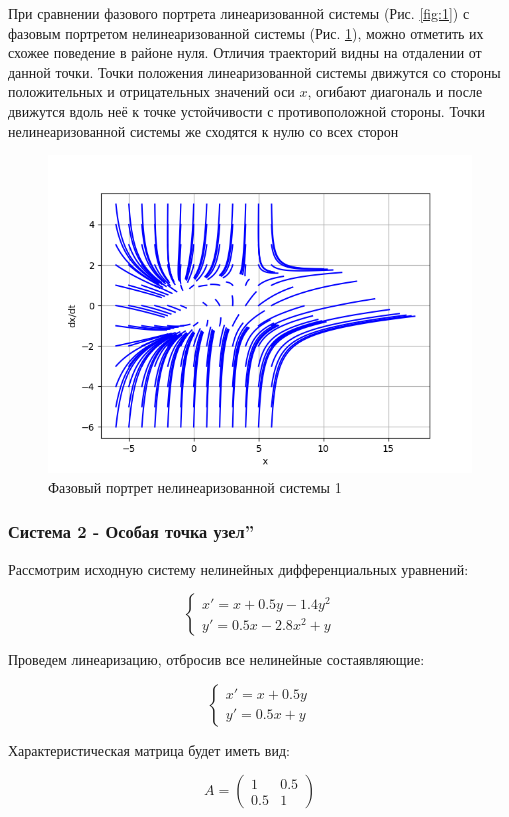 При сравнении фазового портрета линеаризованной системы (Рис. \ref{fig:1}) с фазовым портретом 
нелинеаризованной системы (Рис. \ref{fig:2}), можно отметить их схожее поведение в районе нуля.
Отличия траекторий видны на отдалении от данной точки. Точки положения линеаризованной системы
движутся со стороны положительных и отрицательных значений оси $x$, огибают
диагональ и после движутся вдоль неё к точке устойчивости с противоположной стороны.
Точки нелинеаризованной системы же сходятся к нулю со всех сторон

\begin{figure}[H]
	\centering
	\includegraphics[width=0.6\linewidth]{body/images/System-1.png}
	\caption{Фазовый портрет нелинеаризованной системы 1}
	\label{fig:2}
\end{figure}

\subsubsection{Система 2 - Особая точка  узел\textquotedblright}

Рассмотрим исходную систему нелинейных дифференциальных уравнений:

$$
\begin{cases}
x' = x + 0.5y - 1.4y^2 \\
y' = 0.5x - 2.8x^2 + y
\end{cases}
$$

Проведем линеаризацию, отбросив все нелинейные состаявляющие:

$$
\begin{cases}
	x' = x + 0.5y \\
	y' = 0.5x + y
\end{cases}
$$

Характеристическая матрица будет иметь вид:

$$
A = 
\begin{pmatrix}
	1 & 0.5 \\
	0.5 & 1
\end{pmatrix}
$$

